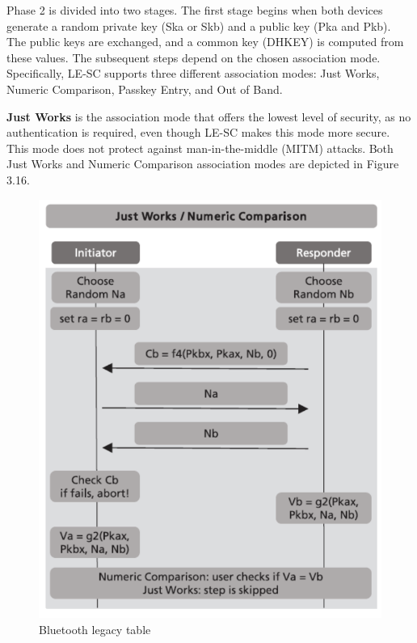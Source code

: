 \documentclass{Configuration_Files/PoliMi3i_thesis}
\begin{document}
Phase 2 is divided into two stages. The first stage begins when both devices generate a random private key (Ska or Skb) and a public key (Pka and Pkb). The public keys are exchanged, and a common key (DHKEY) is computed from these values. The subsequent steps depend on the chosen association mode. Specifically, LE-SC supports three different association modes: Just Works, Numeric Comparison, Passkey Entry, and Out of Band.

\textbf{Just Works} is the association mode that offers the lowest level of security, as no authentication is required, even though LE-SC makes this mode more secure. This mode does not protect against man-in-the-middle (MITM) attacks. Both Just Works and Numeric Comparison association modes are depicted in Figure 3.16.

\begin{figure}[H]
    \centering
    \includegraphics[scale=0.7]{Bluetooth_Security/6.png}
    \caption{Bluetooth legacy table \cite{casarSurveyBluetoothLow2022}}
    \label{bluetooth_sec_6}
\end{figure}
\end{document}
